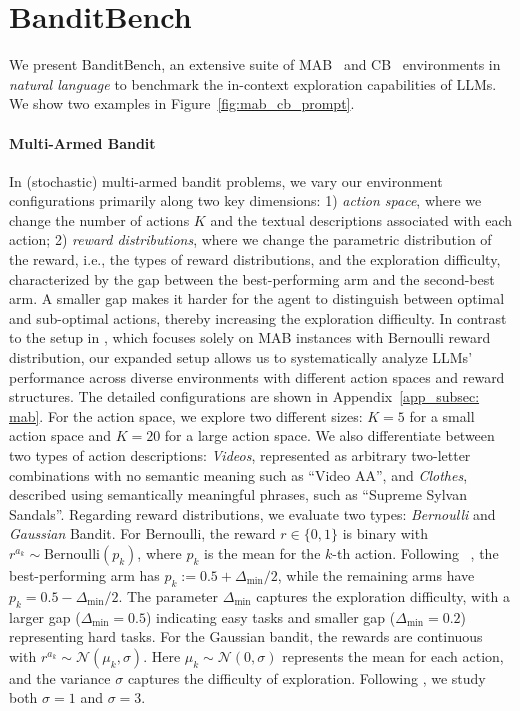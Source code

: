 \documentclass[11pt, logo]{googledeepmind}
\def\gN{{\mathcal{N}}}
\theoremstyle{plain}
\theoremstyle{definition}
\begin{document}
\section{BanditBench}
\label{subsec: banditbench}
We present BanditBench, an extensive suite of MAB~\citep{slivkins2019introduction} and CB~\citep{li2010contextual} environments in \emph{natural language} to benchmark the in-context exploration capabilities of LLMs. We show two examples in Figure~\ref{fig:mab_cb_prompt}.
\paragraph{Multi-Armed Bandit}
In (stochastic) multi-armed bandit problems, we vary our environment configurations primarily along two key dimensions:
1) \emph{action space}, where we change the number of actions $K$ and the textual descriptions associated with each action; 2) \emph{reward distributions}, where we change the parametric distribution of the reward, i.e., the types of reward distributions, and the exploration difficulty, characterized by the gap between the best-performing arm and the second-best arm. A smaller gap makes it harder for the agent to distinguish between optimal and sub-optimal actions, thereby increasing the exploration difficulty.
In contrast to the setup in \citet{krishnamurthy2024can}, which focuses solely on MAB instances with Bernoulli reward distribution, our expanded setup allows us to systematically analyze LLMs' performance across diverse environments with different action spaces and reward structures.
The detailed configurations are shown in Appendix~\ref{app_subsec: mab}.
For the action space, we explore two different sizes: $K=5$ for a small action space and $K=20$ for a large action space. We also differentiate between two types of action descriptions: \emph{Videos}, represented as arbitrary two-letter combinations with no semantic meaning such as ``Video AA'', and \emph{Clothes},  described using semantically meaningful phrases, such as ``Supreme Sylvan Sandals''. Regarding reward distributions, we evaluate two types: \emph{Bernoulli} and \emph{Gaussian} Bandit.
For Bernoulli, the reward $r \in \{0, 1\}$ is binary with $r^{a_k} \sim \text{Bernoulli}(p_k)$, where $p_k$ is the mean for the $k$-th action. Following ~\citet{krishnamurthy2024can}, the best-performing arm has $p_k:=0.5 + \Delta_{\min}/2$, while the remaining arms have $p_k = 0.5 - \Delta_{\min}/2$. The parameter $\Delta_{\min}$ captures the exploration difficulty, with a larger gap ($\Delta_{\min}=0.5$) indicating easy tasks and smaller gap ($\Delta_{\min}=0.2$) representing hard tasks. For the Gaussian bandit, the rewards are continuous with $r^{a_k} \sim \gN(\mu_k, \sigma)$. Here $\mu_k \sim \gN(0, \sigma)$ represents the mean for each action, and the variance $\sigma$ captures the difficulty of exploration. Following \citet{sutton2018reinforcement}, we study both $\sigma=1$ and $\sigma=3$.
\end{document}
